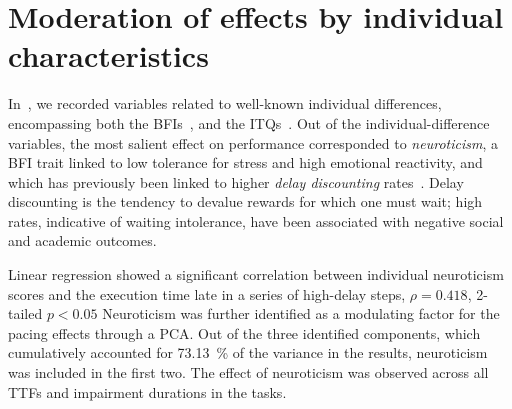 \section{Moderation of effects by individual characteristics}\label{ssec:moderationeffects}

In~\cite{olguinmunoz2021impact}, we recorded variables related to well-known individual differences, encompassing both the \glspl{BFI}~\cite{john1999big}, and the \glspl{ITQ}~\cite{witmer1998measuring}.
Out of the individual-difference variables, the most salient effect on performance corresponded to \emph{neuroticism}, a \gls{BFI} trait linked to low tolerance for stress and high emotional reactivity, and which has previously been linked to higher \emph{delay discounting} rates~\cite{hirsh2008delay}.
Delay discounting is the tendency to devalue rewards for which one must wait; high rates, indicative of waiting intolerance, have been associated with negative social and academic outcomes.



Linear regression showed a significant correlation between individual neuroticism scores and the execution time late in a series of high-delay steps, \( \rho = 0.418 \), \num{2}-tailed \( p < 0.05 \)
Neuroticism was further identified as a modulating factor for the pacing effects through a \gls{PCA}.
Out of the three identified components, which cumulatively accounted for \SI{73.13}{\percent} of the variance in the results, neuroticism was included in the first two.
The effect of neuroticism was observed across all \glspl{TTF} and impairment durations in the tasks.

